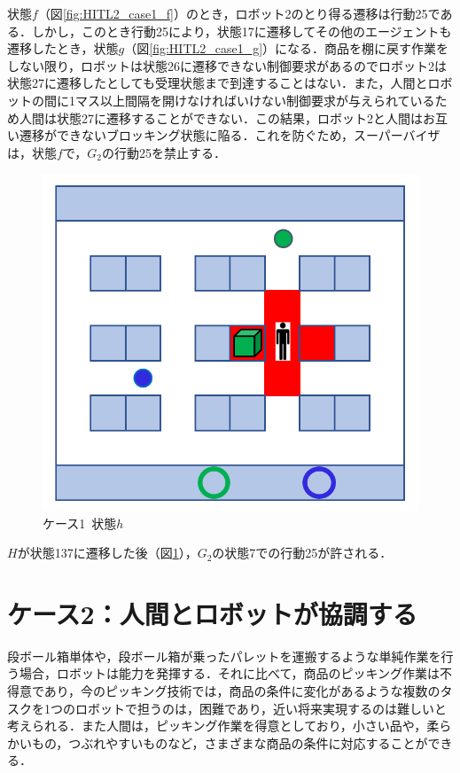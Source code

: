 状態$f$（図\ref{fig:HITL2_case1_f}）のとき，ロボット2のとり得る遷移は行動25である．しかし，このとき行動25により，状態17に遷移してその他のエージェントも遷移したとき，状態$g$（図\ref{fig:HITL2_case1_g}）になる．商品を棚に戻す作業をしない限り，ロボットは状態26に遷移できない制御要求があるのでロボット2は状態27に遷移したとしても受理状態まで到達することはない．また，人間とロボットの間に1マス以上間隔を開けなければいけない制御要求が与えられているため人間は状態27に遷移することができない．この結果，ロボット2と人間はお互い遷移ができないブロッキング状態に陥る．これを防ぐため，スーパーバイザは，状態$f$で，$G_2$の行動25を禁止する．

\begin{figure}[h]
    \centering
    \includegraphics[scale=0.3]{figures/HITL2_case1_h.png}
    \caption{ケース1\ 状態$h$}
    \label{fig:HITL2_case1_h}
\end{figure}

$H$が状態137に遷移した後（図\ref{fig:HITL2_case1_h}），$G_2$の状態7での行動25が許される．


\section{ケース2：人間とロボットが協調する}

段ボール箱単体や，段ボール箱が乗ったパレットを運搬するような単純作業を行う場合，ロボットは能力を発揮する．それに比べて，商品のピッキング作業は不得意であり，今のピッキング技術では，商品の条件に変化があるような複数のタスクを1つのロボットで担うのは，困難であり，近い将来実現するのは難しいと考えられる．また人間は，ピッキング作業を得意としており，小さい品や，柔らかいもの，つぶれやすいものなど，さまざまな商品の条件に対応することができる．

